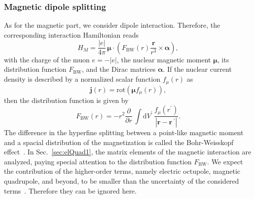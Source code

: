 \subsubsection{Magnetic dipole splitting}
\label{sec:magndip}
As for the magnetic part, we consider dipole interaction. Therefore, the corresponding interaction Hamiltonian reads~\cite{Elizarov2005}
\begin{equation}
\label{eq:Hmag}
H_{M} = \frac{|e|}{4 \pi}\,\boldsymbol{\mu}\cdot \left( F_{\text{BW}}(r) \frac{\mathbf{r}}{r^3} \times \boldsymbol{\alpha} \right),
\end{equation}
with the charge of the muon $e=-|e|$, the nuclear magnetic moment $\boldsymbol{\mu}$, its distribution function $F_{\text{BW}}$, and the Dirac matrices $\boldsymbol{\alpha}$. If the nuclear current density is described by a normalized scalar function $f_\mu(r)$ as
\begin{equation}
\label{eq:currentdistr}
\mathbf{j}(r)= \text{rot}\left(\boldsymbol{\mu}f_\mu(r)\right),
\end{equation}
then the distribution function is given by
\begin{equation}
\label{eq:Fbw}
F_{\text{BW}}(r)=-r^2 \frac{\partial}{\partial r}\,\int \text{d}V^{\prime}\,\frac{f_\mu(r^{\prime})}{|\mathbf{r}-\mathbf{r}\,^{\prime}|}.
\end{equation}
The difference in the hyperfine splitting between a point-like magnetic moment and a spacial distribution of the magnetization is called the Bohr-Weisskopf effect~\cite{bohrWeisskopf1950}. In Sec.~\ref{sec:elQuad1}, the matrix elements of the magnetic interaction are analyzed, paying special attention to the distribution function $F_{\text{BW}}$. We expect the contribution of the higher-order terms, namely electric octupole, magnetic quadrupole, and beyond, to be smaller than the uncertainty of the considered terms~\cite{Devons1995,Steffen1985}. Therefore they can be ignored here.

